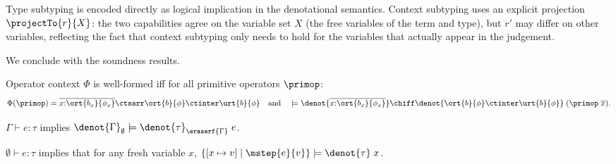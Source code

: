 Type subtyping is encoded directly as logical implication in the
denotational semantics.  Context subtyping uses an explicit projection
$\projectTo{r}{X}$: the two capabilities agree on the variable set $X$
(the free variables of the term and type), but $r'$ may differ on
other variables, reflecting the fact that context subtyping only needs
to hold for the variables that actually appear in the judgement.

We conclude with the soundness results.

\begin{theorem}\label{thm:well-formed-operator}
  Operator context $\Phi$ is well-formed iff for all primitive
  operators $\primop$:
  \begin{align*}
    \Phi(\primop) = \overline{x{:}\ort{b_x}{\phi_x}} \ctsarr \ort{b}{\phi} \ctinter \urt{b}{\phi}
    \quad\text{and}\quad
    \models \denot{\overline{x{:}\ort{b_x}{\phi_x}}} \chiff \denot{\ort{b}{\phi} \ctinter \urt{b}{\phi}}\;(\primop\;\overline{x}).
  \end{align*}
\end{theorem}

\begin{theorem}\label{thm:fundamental}
  $\Gamma \vdash e : \tau$ implies $\denot{\Gamma}_\emptyset \models \denot{\tau}_{\eraserf{\Gamma}}\;e$.
\end{theorem}

\begin{theorem}\label{thm:soundness}
  $\emptyset \vdash e : \tau$ implies that for any fresh variable $x$,
  $\{[x \mapsto v] \mid \mstep{e}{v}\} \models \denot{\tau}\;x$.
\end{theorem}
